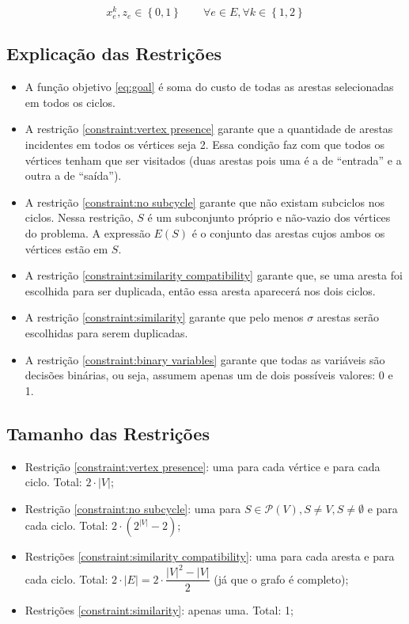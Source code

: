 \documentclass{article}
\newcommand{\Set}[1]{\ensuremath{\left\{#1\right\}}}
\newcommand{\partsof}[1]{\ensuremath{\mathcal{P}\left(#1\right)}}
\newcommand{\abs}[1]{\ensuremath{\left| #1 \right|}}
\newcommand{\binary}{\ensuremath{\Set{0, 1}}}
\newcommand{\edge}{\ensuremath{e}}
\newcommand{\edges}{\ensuremath{E}}
\newcommand{\vertices}{\ensuremath{V}}
\newcommand{\ncycles}{2}
\newcommand{\allCycles}{\ensuremath{\Set{1, \ncycles}}}
\newcommand{\cycle}{\ensuremath{k}}
\newcommand{\subvertices}{\ensuremath{S}}
\newcommand{\X}{\ensuremath{x}}
\newcommand{\xke}{\ensuremath{\X^{\cycle}_{\edge}}}
\newcommand{\ze}{\ensuremath{z_{\edge}}}
\newcommand{\similarity}{\ensuremath{\sigma}}
\begin{document}
\begin{equation}
	\label{constraint:binary variables}
	\xke, \ze \in \binary
	\qquad
	\forall \edge \in \edges,
	\forall \cycle \in \allCycles
\end{equation}

\subsection{Explicação das Restrições}
\label{subsec: constraints explanation}

\begin{itemize}
    \item A função objetivo \eqref{eq:goal} é soma do custo de todas as arestas selecionadas em todos os ciclos.
    \item A restrição \eqref{constraint:vertex presence} garante que a quantidade de arestas incidentes em todos os vértices seja 2. Essa condição faz com que todos os vértices tenham que ser visitados (duas arestas pois uma é a de ``entrada'' e a outra a de ``saída'').
    \item A restrição \eqref{constraint:no subcycle} garante que não existam subciclos nos ciclos. Nessa restrição, $\subvertices$ é um subconjunto próprio e não-vazio dos vértices do problema. A expressão $\edges(\subvertices)$ é o conjunto das arestas cujos ambos os vértices estão em $\subvertices$.
    \item A restrição \eqref{constraint:similarity compatibility} garante que, se uma aresta foi escolhida para ser duplicada, então essa aresta aparecerá nos dois ciclos.
    \item A restrição \eqref{constraint:similarity} garante que pelo menos $\similarity$ arestas serão escolhidas para serem duplicadas.
    \item A restrição \eqref{constraint:binary variables} garante que todas as variáveis são decisões binárias, ou seja, assumem apenas um de dois possíveis valores: 0 e 1.
\end{itemize}

\subsection{Tamanho das Restrições}
\label{subsec:constraints size}

\begin{itemize}
	\item Restrição \eqref{constraint:vertex presence}: uma para cada vértice e para cada ciclo. Total: $\ncycles \cdot \abs{\vertices}$;
	\item Restrição \eqref{constraint:no subcycle}: uma para $\subvertices \in \partsof{\vertices}, \subvertices \neq \vertices, \subvertices \neq \emptyset$ e para cada ciclo. Total: $\ncycles \cdot \left( 2^{\abs{\vertices}} - 2\right)$;
	\item Restrições \eqref{constraint:similarity compatibility}: uma para cada aresta e para cada ciclo. Total: $\ncycles \cdot \abs{\edges} = \ncycles \cdot \dfrac{\abs{\vertices}^2 - \abs{\vertices}}{2}$ (já que o grafo é completo);
	\item Restrições \ref{constraint:similarity}: apenas uma. Total: 1;
\end{itemize}
\end{document}
